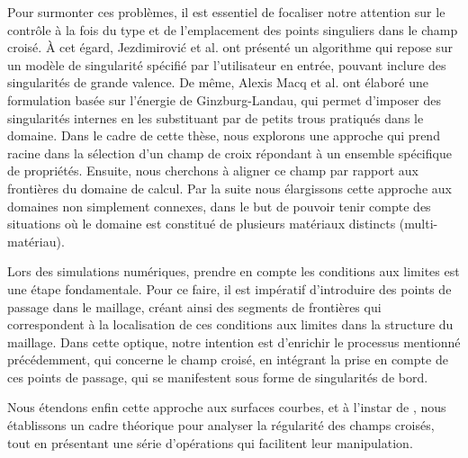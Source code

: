 Pour surmonter ces problèmes, il est essentiel de focaliser notre attention sur le contrôle à la fois du type et de l'emplacement des points singuliers dans le champ croisé. À cet égard, Jezdimirović et al. \cite{jezdimirovic2021quad} ont présenté un algorithme qui repose sur un modèle de singularité spécifié par l'utilisateur en entrée, pouvant inclure des singularités de grande valence. De même, Alexis Macq et al. \cite{macq2020ginzburg} ont élaboré une formulation basée sur l'énergie de Ginzburg-Landau, qui permet d'imposer des singularités internes en les substituant par de petits trous pratiqués dans le domaine. Dans le cadre de cette thèse, nous explorons une approche qui prend racine dans la sélection d'un champ de croix répondant à un ensemble spécifique de propriétés. Ensuite, nous cherchons à aligner ce champ par rapport aux frontières du domaine de calcul. Par la suite nous élargissons cette approche aux domaines non simplement connexes, dans le but de pouvoir tenir compte des situations où le domaine est constitué de plusieurs matériaux distincts (multi-matériau).

Lors des simulations numériques, prendre en compte les conditions aux limites est une étape fondamentale. Pour ce faire, il est impératif d'introduire des points de passage dans le maillage, créant ainsi des segments de frontières qui correspondent à la localisation de ces conditions aux limites dans la structure du maillage. Dans cette optique, notre intention est d'enrichir le processus mentionné précédemment, qui concerne le champ croisé, en intégrant la prise en compte de ces points de passage, qui se manifestent sous forme de singularités de bord.

Nous étendons enfin cette approche aux surfaces courbes, et à l'instar de \cite{viertel2019approach}, nous établissons un cadre théorique pour analyser la régularité des champs croisés, tout en présentant une série d'opérations qui facilitent leur manipulation.

